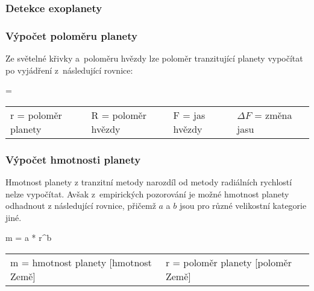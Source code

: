 \documentclass[a4paper,12pt]{article}
\begin{document}
\subsubsection{Detekce exoplanety}

\subsubsection{Výpočet poloměru planety}

Ze světelné křivky a~poloměru hvězdy lze poloměr tranzitující planety vypočítat po vyjádření z~následující rovnice:

 { = }{
\begin{tabular}{llll}
	r = poloměr planety & R = poloměr hvězdy & F = jas hvězdy & $\Delta F$ = změna jasu \
\end{tabular}
}

\subsubsection{Výpočet hmotnosti planety}

Hmotnost planety z tranzitní metody narozdíl od metody radiálních rychlostí nelze vypočítat. Avšak z~empirických pozorování je možné hmotnost planety odhadnout z následující rovnice, přičemž $a$ a $b$ jsou pro různé velikostní kategorie jiné.

 {m = a * r^b}{
\begin{tabular}{ll}
	m = hmotnost planety [hmotnost Země] & r = poloměr planety [poloměr Země] \
\end{tabular}
}
\end{document}
